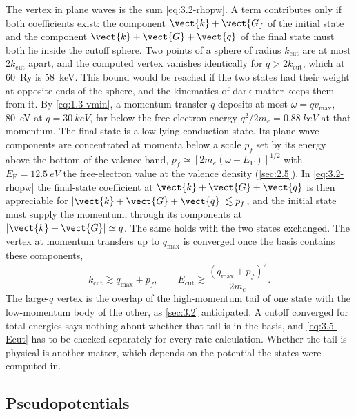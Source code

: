 The vertex in plane waves is the sum \cref{eq:3.2-rhopw}. A term contributes only if both coefficients exist: the component $\vect{k}+\vect{G}$ of the initial state and the component $\vect{k}+\vect{G}+\vect{q}$ of the final state must both lie inside the cutoff sphere. Two points of a sphere of radius $k_{\mathrm{cut}}$ are at most $2k_{\mathrm{cut}}$ apart, and the computed vertex vanishes identically for $q > 2k_{\mathrm{cut}}$, which at \SI{60}{Ry} is \SI{58}{keV}. This bound would be reached if the two states had their weight at opposite ends of the sphere, and the kinematics of dark matter keeps them from it. By \cref{eq:1.3-vmin}, a momentum transfer $q$ deposits at most $\omega = qv_{\mathrm{max}}$, \SI{80}{eV} at $q = \SI{30}{keV}$, far below the free-electron energy $q^2/2m_e = \SI{0.88}{keV}$ at that momentum. The final state is a low-lying conduction state. Its plane-wave components are concentrated at momenta below a scale $p_f$ set by its energy above the bottom of the valence band, $p_f \simeq [2m_e(\omega + E_{\mathrm{F}})]^{1/2}$ with $E_{\mathrm{F}} = \SI{12.5}{eV}$ the free-electron value at the valence density (\cref{sec:2.5}). In \cref{eq:3.2-rhopw} the final-state coefficient at $\vect{k}+\vect{G}+\vect{q}$ is then appreciable for $|\vect{k}+\vect{G}+\vect{q}| \lesssim p_f$, and the initial state must supply the momentum, through its components at $|\vect{k}+\vect{G}| \simeq q$. The same holds with the two states exchanged. The vertex at momentum transfers up to $q_{\mathrm{max}}$ is converged once the basis contains these components,
\begin{equation}
  k_{\mathrm{cut}} \gtrsim q_{\mathrm{max}} + p_f, \qquad
  E_{\mathrm{cut}} \gtrsim \frac{(q_{\mathrm{max}} + p_f)^2}{2m_e} .
  \label{eq:3.5-Ecut}
\end{equation}
The large-$q$ vertex is the overlap of the high-momentum tail of one state with the low-momentum body of the other, as \cref{sec:3.2} anticipated. A cutoff converged for total energies says nothing about whether that tail is in the basis, and \cref{eq:3.5-Ecut} has to be checked separately for every rate calculation. Whether the tail is physical is another matter, which depends on the potential the states were computed in.

\subsection{Pseudopotentials}


